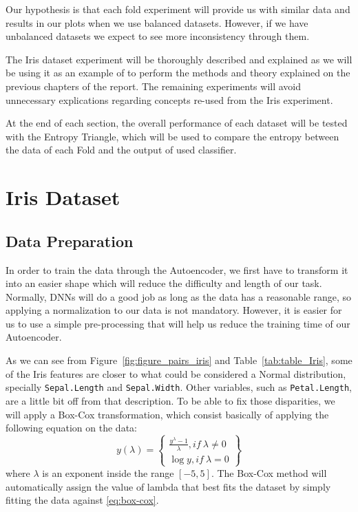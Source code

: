 
Our hypothesis is that each fold experiment will  provide us with similar data and results in our plots when we use balanced datasets. However, if we have unbalanced datasets we expect to see more inconsistency through them.

The Iris dataset experiment will be thoroughly described and explained as we will be using it as an example of to perform the methods and theory explained on the previous chapters of the report. The remaining experiments will avoid unnecessary explications regarding concepts re-used from the Iris experiment.

At the end of each section, the overall performance of each dataset will be tested with the Entropy Triangle, which will be used to compare the entropy between the data of each Fold and the output of used classifier.

\section{Iris Dataset}

\subsection{Data Preparation}

In order to train the data through the Autoencoder, we first have to transform it into an easier shape which will reduce the difficulty and length of our task. Normally, DNNs will do a good job as long as the data has a reasonable range, so applying a normalization to our data is not mandatory. However, it is easier for us to use a simple pre-processing 
that  will help us reduce the training time of our Autoencoder.

As we can see from Figure~\ref{fig:figure_pairs_iris} and Table~\ref{tab:table_Iris}, some of the Iris features are closer to what could be considered a Normal distribution, specially \texttt{Sepal.Length} and \texttt{Sepal.Width}. 
%
Other variables, such as \texttt{Petal.Length},  are a little bit off from that description. To be able to fix those disparities, we will apply a Box-Cox transformation, which consist basically of applying the following equation on the data:
%
\begin{equation}
\label{eq:box-cox}
 {y(\lambda)=} \left\{
 \begin{aligned}
        \frac{y^{\lambda} - 1}{\lambda} ,  if \  \lambda \neq 0\\
        {\log y}, if \ \lambda = 0
       \end{aligned}
 \right\}
 \end{equation} 
\noindent
where $\lambda$ is an exponent inside the range $[-5,5]$. The Box-Cox method will automatically assign the value of lambda that best fits the dataset  by simply fitting the data against \eqref{eq:box-cox}.

